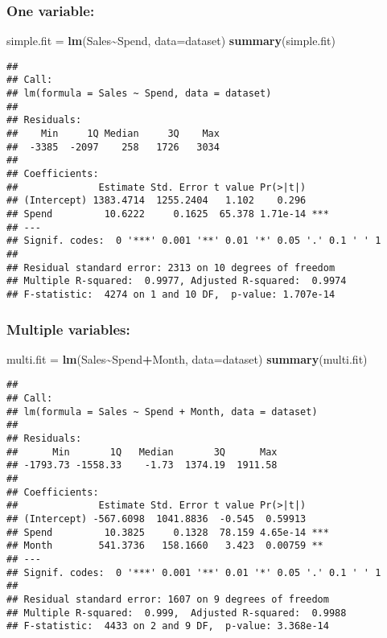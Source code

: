 \documentclass[
]{article}
\newenvironment{Shaded}{\begin{snugshade}}{\end{snugshade}}
\newcommand{\AttributeTok}[1]{\textcolor[rgb]{0.13,0.29,0.53}{#1}}
\newcommand{\FunctionTok}[1]{\textcolor[rgb]{0.13,0.29,0.53}{\textbf{#1}}}
\newcommand{\NormalTok}[1]{#1}
\newcommand{\OtherTok}[1]{\textcolor[rgb]{0.56,0.35,0.01}{#1}}
\newcommand{\SpecialCharTok}[1]{\textcolor[rgb]{0.81,0.36,0.00}{\textbf{#1}}}
\begin{document}
\hypertarget{one-variable}{%
\subsubsection{One variable:}\label{one-variable}}

\begin{Shaded}
\begin{Highlighting}[]
\NormalTok{simple.fit }\OtherTok{=} \FunctionTok{lm}\NormalTok{(Sales}\SpecialCharTok{\textasciitilde{}}\NormalTok{Spend, }\AttributeTok{data=}\NormalTok{dataset) }
\FunctionTok{summary}\NormalTok{(simple.fit) }
\end{Highlighting}
\end{Shaded}

\begin{verbatim}
## 
## Call:
## lm(formula = Sales ~ Spend, data = dataset)
## 
## Residuals:
##    Min     1Q Median     3Q    Max 
##  -3385  -2097    258   1726   3034 
## 
## Coefficients:
##              Estimate Std. Error t value Pr(>|t|)    
## (Intercept) 1383.4714  1255.2404   1.102    0.296    
## Spend         10.6222     0.1625  65.378 1.71e-14 ***
## ---
## Signif. codes:  0 '***' 0.001 '**' 0.01 '*' 0.05 '.' 0.1 ' ' 1
## 
## Residual standard error: 2313 on 10 degrees of freedom
## Multiple R-squared:  0.9977, Adjusted R-squared:  0.9974 
## F-statistic:  4274 on 1 and 10 DF,  p-value: 1.707e-14
\end{verbatim}

\hypertarget{multiple-variables}{%
\subsubsection{Multiple variables:}\label{multiple-variables}}

\begin{Shaded}
\begin{Highlighting}[]
\NormalTok{multi.fit }\OtherTok{=} \FunctionTok{lm}\NormalTok{(Sales}\SpecialCharTok{\textasciitilde{}}\NormalTok{Spend}\SpecialCharTok{+}\NormalTok{Month, }\AttributeTok{data=}\NormalTok{dataset) }
\FunctionTok{summary}\NormalTok{(multi.fit) }
\end{Highlighting}
\end{Shaded}

\begin{verbatim}
## 
## Call:
## lm(formula = Sales ~ Spend + Month, data = dataset)
## 
## Residuals:
##      Min       1Q   Median       3Q      Max 
## -1793.73 -1558.33    -1.73  1374.19  1911.58 
## 
## Coefficients:
##              Estimate Std. Error t value Pr(>|t|)    
## (Intercept) -567.6098  1041.8836  -0.545  0.59913    
## Spend         10.3825     0.1328  78.159 4.65e-14 ***
## Month        541.3736   158.1660   3.423  0.00759 ** 
## ---
## Signif. codes:  0 '***' 0.001 '**' 0.01 '*' 0.05 '.' 0.1 ' ' 1
## 
## Residual standard error: 1607 on 9 degrees of freedom
## Multiple R-squared:  0.999,  Adjusted R-squared:  0.9988 
## F-statistic:  4433 on 2 and 9 DF,  p-value: 3.368e-14
\end{verbatim}
\end{document}
